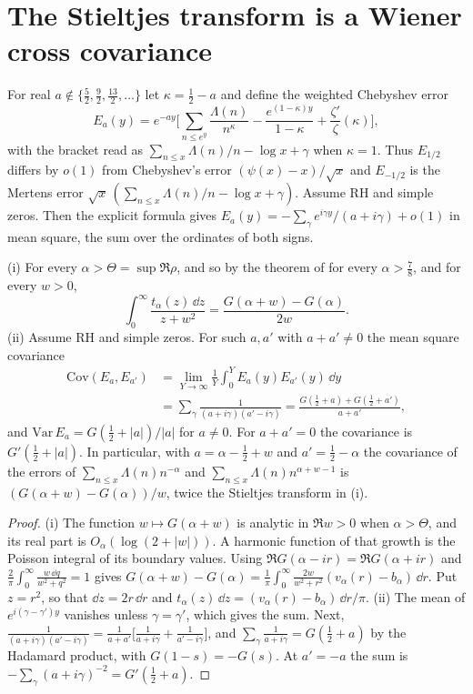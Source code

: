 \section{The Stieltjes transform is a Wiener cross covariance}\label{cw:sec:cov}

For real $a\notin\{\frac52,\frac92,\frac{13}2,\dots\}$ let $\kappa=\frac12-a$ and define the weighted Chebyshev error
\[
E_a(y)=e^{-ay}\Big[\sum_{n\le e^y}\frac{\Lambda(n)}{n^{\kappa}}-\frac{e^{(1-\kappa)y}}{1-\kappa}+\frac{\zeta'}{\zeta}(\kappa)\Big],
\]
with the bracket read as $\sum_{n\le x}\Lambda(n)/n-\log x+\gamma$ when $\kappa=1$. Thus $E_{1/2}$ differs by $o(1)$ from Chebyshev's error $(\psi(x)-x)/\sqrt x$ and $E_{-1/2}$ is the Mertens error $\sqrt x\,(\sum_{n\le x}\Lambda(n)/n-\log x+\gamma)$. Assume RH and simple zeros. Then the explicit formula gives $E_a(y)=-\sum_\gamma e^{i\gamma y}/(a+i\gamma)+o(1)$ in mean square, the sum over the ordinates of both signs.

\begin{theorem}\label{cw:thm:cov}
(i) For every $\alpha>\Theta=\sup\Re\rho$, and so by the theorem of \cite{OAI26a} for every $\alpha>\frac78$, and for every $w>0$,
\[
\int_0^\infty\frac{t_\alpha(z)\,\dd z}{z+w^2}=\frac{G(\alpha+w)-G(\alpha)}{2w}.
\]
(ii) Assume RH and simple zeros. For such $a,a'$ with $a+a'\ne0$ the mean square covariance
\[
\begin{aligned}\mathrm{Cov}(E_a,E_{a'})&=\lim_{Y\to\infty}\frac1Y\int_0^YE_a(y)E_{a'}(y)\,\dd y\\&=\sum_\gamma\frac1{(a+i\gamma)(a'-i\gamma)}=\frac{G(\frac12+a)+G(\frac12+a')}{a+a'},\end{aligned}
\]
and $\mathrm{Var}\,E_a=G(\frac12+|a|)/|a|$ for $a\ne0$. For $a+a'=0$ the covariance is $G'(\frac12+|a|)$. In particular, with $a=\alpha-\frac12+w$ and $a'=\frac12-\alpha$ the covariance of the errors of $\sum_{n\le x}\Lambda(n)n^{-\alpha}$ and $\sum_{n\le x}\Lambda(n)n^{\alpha+w-1}$ is $(G(\alpha+w)-G(\alpha))/w$, twice the Stieltjes transform in (i).
\end{theorem}

\begin{proof}
(i) The function $w\mapsto G(\alpha+w)$ is analytic in $\Re w>0$ when $\alpha>\Theta$, and its real part is $O_\alpha(\log(2+|w|))$. A harmonic function of that growth is the Poisson integral of its boundary values. Using $\Re G(\alpha-ir)=\Re G(\alpha+ir)$ and $\frac2\pi\int_0^\infty\frac{w\,\dd q}{w^2+q^2}=1$ gives $G(\alpha+w)-G(\alpha)=\frac1\pi\int_0^\infty\frac{2w}{w^2+r^2}(v_\alpha(r)-b_\alpha)\,\dd r$. Put $z=r^2$, so that $\dd z=2r\,\dd r$ and $t_\alpha(z)\,\dd z=(v_\alpha(r)-b_\alpha)\,\dd r/\pi$.
(ii) The mean of $e^{i(\gamma-\gamma')y}$ vanishes unless $\gamma=\gamma'$, which gives the sum. Next, $\frac1{(a+i\gamma)(a'-i\gamma)}=\frac1{a+a'}\big[\frac1{a+i\gamma}+\frac1{a'-i\gamma}\big]$, and $\sum_\gamma\frac1{a+i\gamma}=G(\frac12+a)$ by the Hadamard product, with $G(1-s)=-G(s)$. At $a'=-a$ the sum is $-\sum_\gamma(a+i\gamma)^{-2}=G'(\frac12+a)$.
\end{proof}

